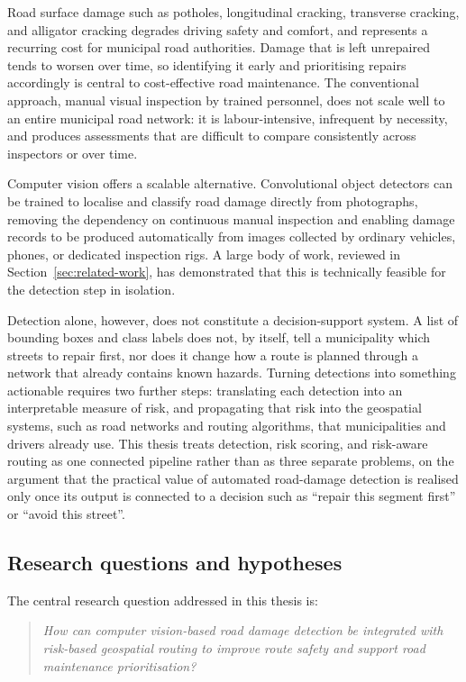 \documentclass[10pt,a4paper,twocolumn]{article}
\begin{document}
Road surface damage such as potholes, longitudinal cracking, transverse
cracking, and alligator cracking degrades driving safety and comfort, and
represents a recurring cost for municipal road authorities. Damage that
is left unrepaired tends to worsen over time, so identifying it early and
prioritising repairs accordingly is central to cost-effective road
maintenance. The conventional approach, manual visual inspection by
trained personnel, does not scale well to an entire municipal road
network: it is labour-intensive, infrequent by necessity, and produces
assessments that are difficult to compare consistently across inspectors
or over time.

Computer vision offers a scalable alternative. Convolutional object
detectors can be trained to localise and classify road damage directly
from photographs, removing the dependency on continuous manual
inspection and enabling damage records to be produced automatically from
images collected by ordinary vehicles, phones, or dedicated inspection
rigs. A large body of work, reviewed in Section~\ref{sec:related-work},
has demonstrated that this is technically feasible for the detection
step in isolation.

Detection alone, however, does not constitute a decision-support system.
A list of bounding boxes and class labels does not, by itself, tell a
municipality which streets to repair first, nor does it change how a
route is planned through a network that already contains known hazards.
Turning detections into something actionable requires two further steps:
translating each detection into an interpretable measure of risk, and
propagating that risk into the geospatial systems, such as road networks
and routing algorithms, that municipalities and drivers already use. This
thesis treats detection, risk scoring, and risk-aware routing as one
connected pipeline rather than as three separate problems, on the
argument that the practical value of automated road-damage detection is
realised only once its output is connected to a decision such as ``repair
this segment first'' or ``avoid this street''.

\subsection{Research questions and hypotheses}
\label{sec:research-questions}

The central research question addressed in this thesis is:

\begin{quote}
\emph{How can computer vision-based road damage detection be integrated
with risk-based geospatial routing to improve route safety and support
road maintenance prioritisation?}
\end{quote}
\end{document}

